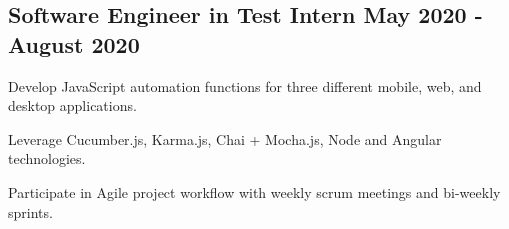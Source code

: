 \vspace*{12pt}
\subsection{{Software Engineer in Test Intern }\hfill May 2020 - August 2020}
\begin{zitemize}
    \item Develop JavaScript automation functions for three different mobile, web, and desktop applications.
    \item Leverage Cucumber.js, Karma.js, Chai + Mocha.js, Node and Angular technologies.
    \item Participate in Agile project workflow with weekly scrum meetings and bi-weekly sprints. 
\end{zitemize}



% 


